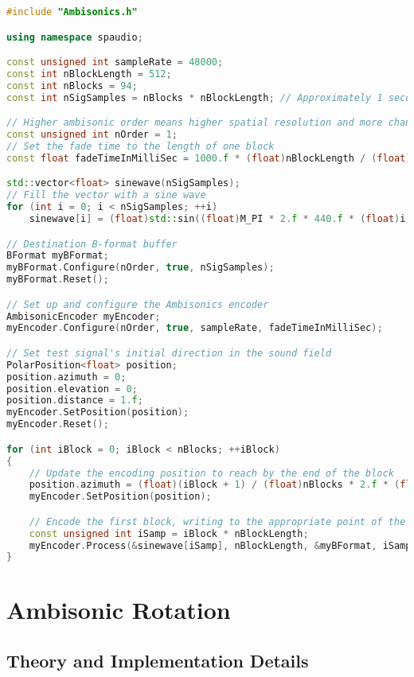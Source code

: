 \documentclass[12pt]{report}
\begin{document}
\begin{lstlisting}[language=C++]
#include "Ambisonics.h"

using namespace spaudio;

const unsigned int sampleRate = 48000;
const int nBlockLength = 512;
const int nBlocks = 94;
const int nSigSamples = nBlocks * nBlockLength; // Approximately 1 second @ 48 kHz

// Higher ambisonic order means higher spatial resolution and more channels required
const unsigned int nOrder = 1;
// Set the fade time to the length of one block
const float fadeTimeInMilliSec = 1000.f * (float)nBlockLength / (float)sampleRate;

std::vector<float> sinewave(nSigSamples);
// Fill the vector with a sine wave
for (int i = 0; i < nSigSamples; ++i)
    sinewave[i] = (float)std::sin((float)M_PI * 2.f * 440.f * (float)i / (float)sampleRate);

// Destination B-format buffer
BFormat myBFormat;
myBFormat.Configure(nOrder, true, nSigSamples);
myBFormat.Reset();

// Set up and configure the Ambisonics encoder
AmbisonicEncoder myEncoder;
myEncoder.Configure(nOrder, true, sampleRate, fadeTimeInMilliSec);

// Set test signal's initial direction in the sound field
PolarPosition<float> position;
position.azimuth = 0;
position.elevation = 0;
position.distance = 1.f;
myEncoder.SetPosition(position);
myEncoder.Reset();

for (int iBlock = 0; iBlock < nBlocks; ++iBlock)
{
    // Update the encoding position to reach by the end of the block
    position.azimuth = (float)(iBlock + 1) / (float)nBlocks * 2.f * (float)M_PI;
    myEncoder.SetPosition(position);

    // Encode the first block, writing to the appropriate point of the destination buffer
    const unsigned int iSamp = iBlock * nBlockLength;
    myEncoder.Process(&sinewave[iSamp], nBlockLength, &myBFormat, iSamp);
}
\end{lstlisting}

\section{Ambisonic Rotation}\label{AmbiRotation}

\subsection{Theory and Implementation Details}
\end{document}
